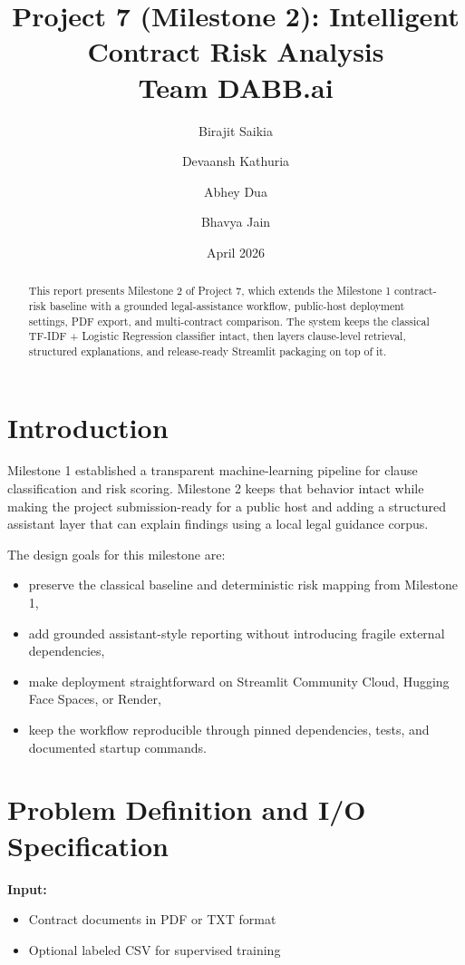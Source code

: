 \documentclass[11pt]{article}
\title{Project 7 (Milestone 2): Intelligent Contract Risk Analysis\\\large Team DABB.ai}
\author{Birajit Saikia \and Devaansh Kathuria \and Abhey Dua \and Bhavya Jain}
\date{April 2026}
\begin{document}
\maketitle

\begin{abstract}
This report presents Milestone 2 of Project 7, which extends the Milestone 1 contract-risk baseline with a grounded legal-assistance workflow, public-host deployment settings, PDF export, and multi-contract comparison. The system keeps the classical TF-IDF + Logistic Regression classifier intact, then layers clause-level retrieval, structured explanations, and release-ready Streamlit packaging on top of it.
\end{abstract}

\section{Introduction}
Milestone 1 established a transparent machine-learning pipeline for clause classification and risk scoring. Milestone 2 keeps that behavior intact while making the project submission-ready for a public host and adding a structured assistant layer that can explain findings using a local legal guidance corpus.

The design goals for this milestone are:
\begin{itemize}
    \item preserve the classical baseline and deterministic risk mapping from Milestone 1,
    \item add grounded assistant-style reporting without introducing fragile external dependencies,
    \item make deployment straightforward on Streamlit Community Cloud, Hugging Face Spaces, or Render,
    \item keep the workflow reproducible through pinned dependencies, tests, and documented startup commands.
\end{itemize}

\section{Problem Definition and I/O Specification}
\textbf{Input:}
\begin{itemize}
    \item Contract documents in PDF or TXT format
    \item Optional labeled CSV for supervised training
\end{itemize}
\end{document}
